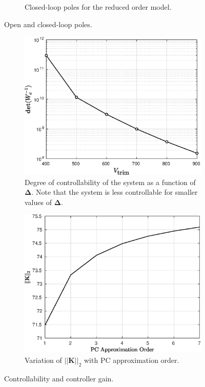 \documentclass[letterpaper, 10 pt, conference]{ieeeconf}  %
\newcommand{\vo}[1]{\boldsymbol{#1}}
\newcommand{\Del}{\vo{\Delta}}
\begin{document}
\begin{figure}[h!]
\begin{subfigure}[t]{0.23\textwidth}
   \caption{Closed-loop poles for the reduced order model.}
   \label{clLoopPoles}
   \end{subfigure}
   \caption{Open and closed-loop poles.}
\end{figure}

\begin{figure}[!ht]
\begin{subfigure}[t]{0.23\textwidth}
   \includegraphics[width=\textwidth]{figs/ctrbEnergy.eps}
   \caption{Degree of controllability of the system as a function of $\Del$. Note that the system is less controllable for smaller values of $\Del$.}
   \label{ctrbEnergy}
	\end{subfigure}\hfill
   \begin{subfigure}[t]{0.23\textwidth}
   \includegraphics[width=\textwidth]{figs/kGain.eps}
   \caption{Variation of $||\vo{K}||_2$ with PC approximation order.}
   \label{kGain}
   \end{subfigure}
   \caption{Controllability and controller gain.}
\end{figure}
\end{document}
